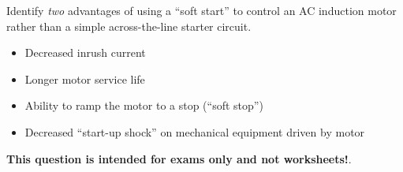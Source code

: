 

Identify {\it two} advantages of using a ``soft start'' to control an AC induction motor rather than a simple across-the-line starter circuit.

\vskip 100pt







\begin{itemize}
\item{} Decreased inrush current
\item{} Longer motor service life
\item{} Ability to ramp the motor to a stop (``soft stop'')
\item{} Decreased ``start-up shock'' on mechanical equipment driven by motor
\end{itemize}







{\bf This question is intended for exams only and not worksheets!}.


